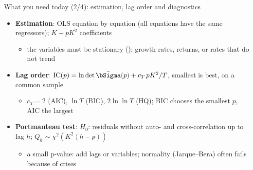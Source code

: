 \begin{frame}{What you need today (2/4): estimation, lag order and diagnostics}
\itemsize{\small}
\begin{itemize}
    \item \textbf{Estimation}: OLS equation by equation (all equations have the same regressors); $K + pK^2$ coefficients
    \begin{itemize}
        \item the variables must be stationary (): growth rates, returns, or rates that do not trend
    \end{itemize}
    \item \textbf{Lag order}: $\mathrm{IC}(p) = \ln\det\tilde\bSigma(p) + c_T\,pK^2/T$, smallest is best, on a common sample
    \begin{itemize}
        \item $c_T = 2$ (AIC), $\ln T$ (BIC), $2\ln\ln T$ (HQ); BIC chooses the smallest $p$, AIC the largest
    \end{itemize}
    \item \textbf{Portmanteau test}: $H_0$: residuals without auto- and cross-correlation up to lag $h$; $Q_h \sim \chi^2(K^2(h - p))$
    \begin{itemize}
        \item a small p-value: add lags or variables; normality (Jarque--Bera) often fails because of crises
    \end{itemize}
\end{itemize}
\end{frame}

